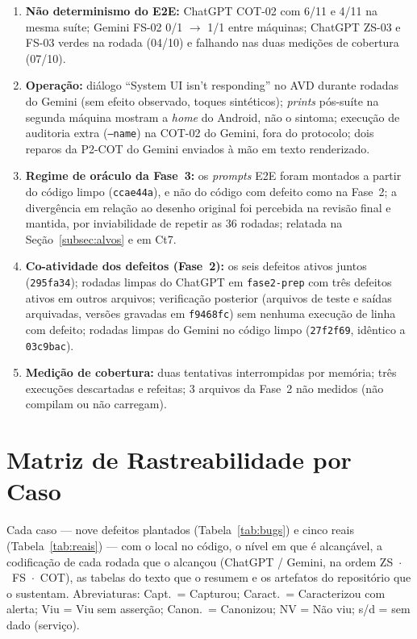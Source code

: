 \documentclass[12pt]{article}
\begin{document}
\begin{enumerate}
\item \textbf{Não determinismo do E2E:} ChatGPT COT-02 com 6/11 e 4/11 na mesma suíte; Gemini FS-02 0/1 $\to$ 1/1 entre máquinas; ChatGPT ZS-03 e FS-03 verdes na rodada (04/10) e falhando nas duas medições de cobertura (07/10).
\item \textbf{Operação:} diálogo ``System UI isn't responding'' no AVD durante rodadas do Gemini (sem efeito observado, toques sintéticos); \textit{prints} pós-suíte na segunda máquina mostram a \textit{home} do Android, não o sintoma; execução de auditoria extra (\texttt{--name}) na COT-02 do Gemini, fora do protocolo; dois reparos da P2-COT do Gemini enviados à mão em texto renderizado.
\item \textbf{Regime de oráculo da Fase~3:} os \textit{prompts} E2E foram montados a partir do código limpo (\texttt{ccae44a}), e não do código com defeito como na Fase~2; a divergência em relação ao desenho original foi percebida na revisão final e mantida, por inviabilidade de repetir as 36 rodadas; relatada na Seção~\ref{subsec:alvos} e em Ct7.
\item \textbf{Co-atividade dos defeitos (Fase~2):} os seis defeitos ativos juntos (\texttt{295fa34}); rodadas limpas do ChatGPT em \texttt{fase2-prep} com três defeitos ativos em outros arquivos; verificação posterior (arquivos de teste e saídas arquivadas, versões gravadas em \texttt{f9468fc}) sem nenhuma execução de linha com defeito; rodadas limpas do Gemini no código limpo (\texttt{27f2f69}, idêntico a \texttt{03c9bac}).
\item \textbf{Medição de cobertura:} duas tentativas interrompidas por memória; três execuções descartadas e refeitas; 3 arquivos da Fase~2 não medidos (não compilam ou não carregam).
\end{enumerate}

\section{Matriz de Rastreabilidade por Caso}
\label{sec:apendice-matriz}

Cada caso --- nove defeitos plantados (Tabela~\ref{tab:bugs}) e cinco reais
(Tabela~\ref{tab:reais}) --- com o local no código, o nível em que é
alcançável, a codificação de cada rodada que o alcançou (ChatGPT / Gemini,
na ordem ZS~$\cdot$~FS~$\cdot$~COT), as tabelas do texto que o resumem e os
artefatos do repositório que o sustentam. Abreviaturas: Capt.\ =
Capturou; Caract.\ = Caracterizou com alerta; Viu = Viu sem asserção;
Canon.\ = Canonizou; NV = Não viu; s/d = sem dado (serviço).
\end{document}
